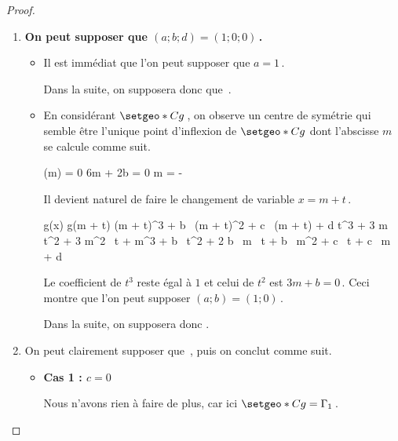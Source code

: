 \begin{proof}
	\leavevmode
	\begin{enumerate}
		\item \textbf{On peut supposer que $(a ; b ; d) = (1 ; 0 ; 0)$\,.}
		\begin{itemize}
			\item Il est immédiat que l'on peut supposer que $a = 1$\,. 
				          
			Dans la suite, on supposera donc que \,.

			\item En considérant $\setgeo*{C}{g}$\,, on observe un centre de symétrie qui semble être l'unique point d'inflexion de $\setgeo*{C}{g}$ dont l'abscisse $m$ se calcule comme suit.
					      
			\smallskip
			\noindent\kern-5pt
			\begin{stepcalc}[style = sar, ope = \iff]
				(m) = 0
			\explnext{}
				6m + 2b = 0
			\explnext{}
				m = - 
			\end{stepcalc}
					      
			\smallskip
			\noindent
			Il devient naturel de faire le changement de variable $x = m + t$\,.
			
			\smallskip
			\noindent\kern-5pt
			\begin{stepcalc}[style = sar]
				g(x)
				\explnext{}
				g(m + t)
				\explnext{}
				(m + t)^3 + b \, (m + t)^2 + c \, (m + t) + d
				\explnext{}
				  t^3 + 3 m \, t^2 + 3 m^2 \, t    + m^3
			          + b \, t^2   + 2 b \, m \, t + b \, m^2
				                   + c \, t        + c \, m + d
			\end{stepcalc} 
			
			\smallskip
			\noindent
			Le coefficient de $t^3$ reste égal à $1$ et celui de $t^2$ est $3m + b = 0$\,. Ceci montre que l'on peut supposer $(a ; b) = (1 ; 0)$\,.
			
			Dans la suite, on supposera donc .
		\end{itemize}




		\newpage
		\item On peut clairement supposer que \,, puis on conclut comme suit.
		\begin{itemize}
		\item \textbf{Cas 1 : $c = 0$}
		
		\smallskip
		\noindent
		Nous n'avons rien à faire de plus, car ici $\setgeo*{C}{g} = \Gamma_1$\,.



\end{itemize}
\end{enumerate}
\end{proof}
